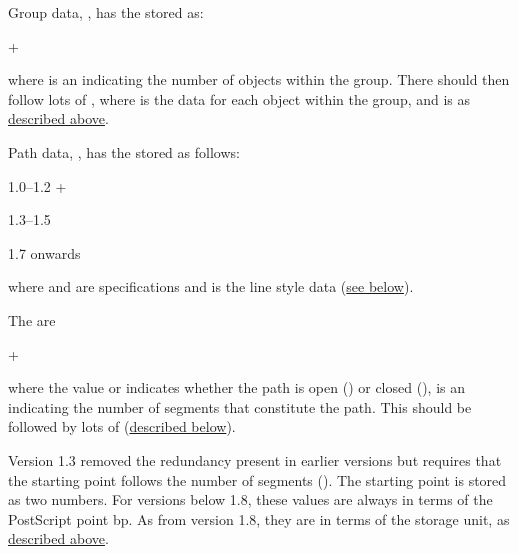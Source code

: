 \begin{numbered}
\item\label{jdr:group} Group data, , has the
 stored as:
\begin{syntaxline}
 +
\end{syntaxline}
where  is an  indicating the number of
\glspl{object} within the
\gls{group}. There should then follow  lots of
, where  is the data for each
\gls{object} within the group, and is
as \hyperref[jdr:object]{described above}.

\item\label{jdr:path} Path data, , has the
 stored as follows:
\begin{syntaxline}
\begin{jdrversion}{1.0--1.2}
  
\textbar{}
 +
\end{jdrversion}
\begin{jdrversion}{1.3--1.5}
   
\end{jdrversion}
\begin{jdrversion}{1.6}
 
\end{jdrversion}
\begin{jdrversion}{1.7 onwards}
 
\end{jdrversion}
\end{syntaxline}
where  and  are 
specifications and 
is the line style data (\hyperref[jdr:linestyle]{see below}).

The  are
\begin{syntaxline}
\textbar{}   +
\end{syntaxline}
where the  value  or  indicates whether the path is
open () or closed (),  is an 
indicating the number of segments that constitute the path. This
should be followed by  lots of 
(\hyperref[jdr:segment]{described below}).

Version 1.3 removed the redundancy present in earlier versions
but requires that the starting point 
follows the number of segments (). The starting point
is stored as two  numbers. For versions below 1.8,
these values are always in terms of the PostScript point \gls{bp}.
As from version 1.8, they are in terms of the storage unit, as
\hyperref[jdr:storageunit]{described above}.


\end{numbered}
